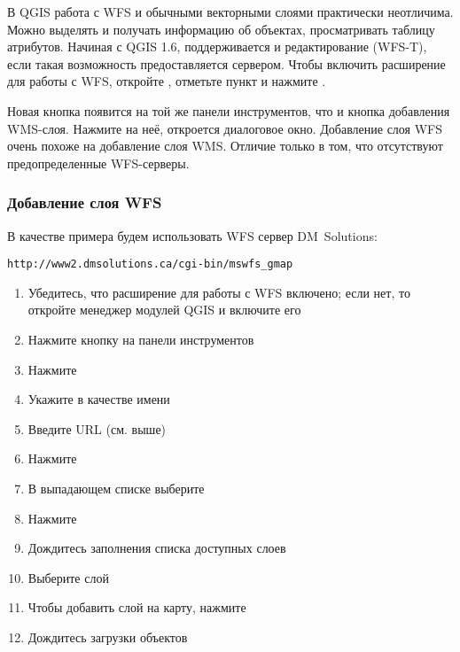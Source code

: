 В QGIS работа с WFS и обычными векторными слоями практически неотличима.
Можно выделять и получать информацию об объектах, просматривать таблицу
атрибутов. Начиная с QGIS 1.6, поддерживается и редактирование (WFS-T), если
такая возможность предоставляется сервером. Чтобы включить расширение для
работы с WFS, откройте  \arrow
{},
отметьте пункт  и нажмите .

Новая кнопка  появится на той
же панели инструментов, что и кнопка добавления WMS-слоя. Нажмите на неё,
откроется диалоговое окно. Добавление слоя WFS очень похоже на добавление слоя
WMS. Отличие только в том, что отсутствуют предопределенные WFS-серверы.

\subsubsection{Добавление слоя WFS}

В качестве примера будем использовать WFS сервер DM~Solutions:
\begin{verbatim}
http://www2.dmsolutions.ca/cgi-bin/mswfs_gmap
\end{verbatim}

\begin{enumerate}
  \item Убедитесь, что расширение для работы с WFS включено; если нет, то
  откройте менеджер модулей QGIS и включите его
  \item Нажмите кнопку
  на панели инструментов
  \item Нажмите 
  \item Укажите  в качестве имени
  \item Введите URL (см. выше)
  \item Нажмите 
  \item В выпадающем списке выберите 
  \item Нажмите 
  \item Дождитесь заполнения списка доступных слоев
  \item Выберите слой 
  \item Чтобы добавить слой на карту, нажмите 
  \item Дождитесь загрузки объектов
\end{enumerate}

